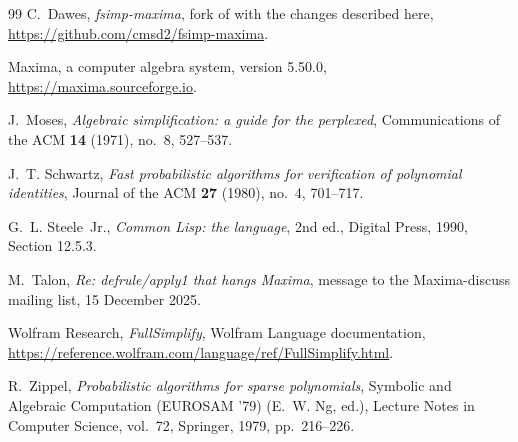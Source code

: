 \documentclass[11pt]{amsart}
\theoremstyle{definition}
\theoremstyle{remark}
\begin{document}
\begin{thebibliography}{99}
C.~Dawes, \emph{fsimp-maxima}, fork of \cite{fullsimp} with the changes
described here, \url{https://github.com/cmsd2/fsimp-maxima}.

Maxima, a computer algebra system, version 5.50.0,
\url{https://maxima.sourceforge.io}.

J.~Moses, \emph{Algebraic simplification: a guide for the perplexed},
Communications of the ACM \textbf{14} (1971), no.~8, 527--537.

J.~T. Schwartz, \emph{Fast probabilistic algorithms for verification of
polynomial identities}, Journal of the ACM \textbf{27} (1980), no.~4,
701--717.

G.~L. Steele~Jr., \emph{Common {L}isp: the language}, 2nd ed., Digital Press,
1990, Section 12.5.3.

M.~Talon, \emph{Re: defrule/apply1 that hangs Maxima}, message to the
Maxima-discuss mailing list, 15 December 2025.

Wolfram Research, \emph{FullSimplify}, Wolfram Language documentation,
\url{https://reference.wolfram.com/language/ref/FullSimplify.html}.

R.~Zippel, \emph{Probabilistic algorithms for sparse polynomials}, Symbolic
and Algebraic Computation (EUROSAM '79) (E.~W. Ng, ed.), Lecture Notes in
Computer Science, vol.~72, Springer, 1979, pp.~216--226.

\end{thebibliography}
\end{document}
